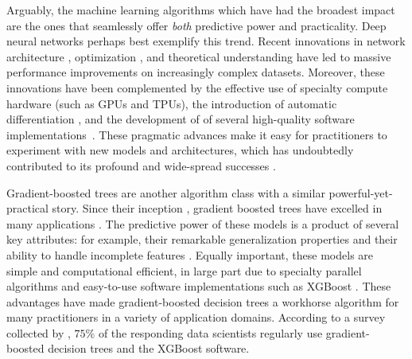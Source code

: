 Arguably, the machine learning algorithms which have had the broadest impact are the ones that seamlessly offer \emph{both} predictive power and practicality.
Deep neural networks perhaps best exemplify this trend.
Recent innovations in
network architecture \citep[e.g.][]{he2016deep,vaswani2017attention,devlin2018bert,huang2019convolutional},
optimization \citep[e.g.][]{ioffe2015batch,izmailov2018averaging},
and theoretical understanding \citep[e.g.][]{keskar2016large,jacot2018neural,arora2019fine}
have led to massive performance improvements on increasingly complex datasets.
Moreover, these innovations have been complemented by
the effective use of specialty compute hardware (such as GPUs and TPUs),
the introduction of automatic differentiation \citep[e.g.][]{paszke2017automatic},
and the development of of several high-quality software implementations~\citep[e.g.][]{jia2014caffe,abadi2016tensorflow,paszke2019pytorch}.
These pragmatic advances make it easy for practitioners to experiment with new models and architectures, which has undoubtedly contributed to its profound and wide-spread successes \cite{goodfellow2016deep}.

Gradient-boosted trees are another algorithm class with a similar powerful-yet-practical story.
Since their inception \cite{friedman2001greedy,friedman2002stochastic}, gradient boosted trees have excelled in many applications \citep[e.g.][]{richardson2007predicting,burges2010ranknet}.
The predictive power of these models is a product of several key attributes: for example, their remarkable generalization properties \citep{freund1997decision,schapire2013boosting} and their ability to handle incomplete features \cite{friedman2001greedy}.
Equally important, these models are simple and computational efficient, in large part due to specialty parallel algorithms \citep[e.g.][]{tyree2011parallel,ke2017lightgbm} and easy-to-use software implementations such as XGBoost \cite{chen2016xgboost}.
These advantages have made gradient-boosted decision trees a workhorse algorithm for many practitioners in a variety of application domains.
According to a survey collected by \citet{kaggle2019kaggle}, $75\%$ of the responding data scientists regularly use gradient-boosted decision trees and the XGBoost software.

